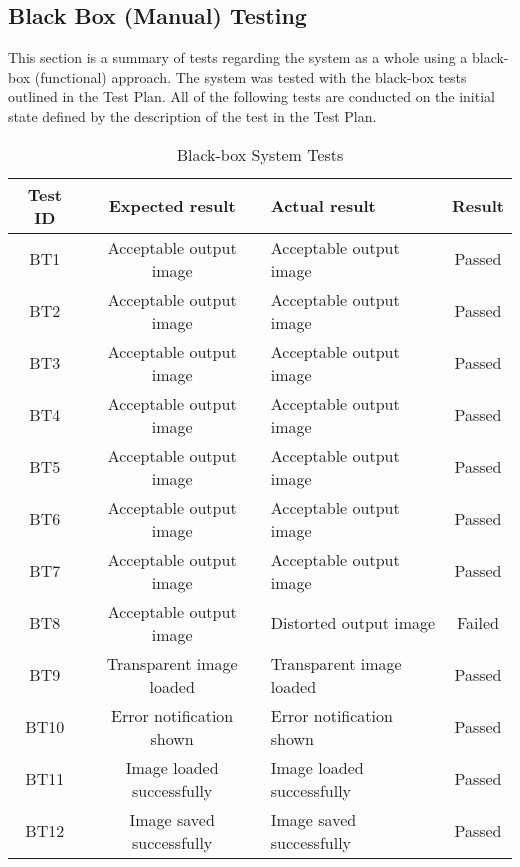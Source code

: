 \documentclass{article}
\begin{document}
\newpage

\subsection{Black Box (Manual) Testing }

This section is a summary of tests regarding the system as a whole using a black-box (functional) approach. The system was tested with the black-box tests outlined in the Test Plan. All of the following tests are conducted on the initial state defined by the description of the test in the Test Plan.

\begin{table}[H]
    \caption{Black-box System Tests}
    \label{tab:bb}
    \centering
    \begin{tabular}{|c|c|p{}||c|}
        \hline
        \textbf{Test ID} & \textbf{Expected result} & \textbf{Actual result} & \textbf{Result}\\
        \hline
        BT1 & Acceptable output image & Acceptable output image & Passed \\
        \hline
        BT2 & Acceptable output image & Acceptable output image & Passed \\
        \hline
        BT3 & Acceptable output image & Acceptable output image & Passed \\
        \hline
        BT4 & Acceptable output image & Acceptable output image & Passed \\
        \hline
        BT5 & Acceptable output image & Acceptable output image & Passed \\
        \hline
        BT6 & Acceptable output image & Acceptable output image & Passed \\
        \hline
        BT7 & Acceptable output image & Acceptable output image & Passed \\
        \hline
        BT8 & Acceptable output image & Distorted output image & Failed \\
        \hline
        BT9 & Transparent image loaded & Transparent image loaded & Passed \\
        \hline
        BT10 & Error notification shown  & Error notification shown & Passed \\
        \hline
        BT11 & Image loaded successfully & Image loaded successfully & Passed \\
        \hline
        BT12 & Image saved successfully & Image saved successfully & Passed \\
        \hline

\end{tabular}
\end{table}
\end{document}
